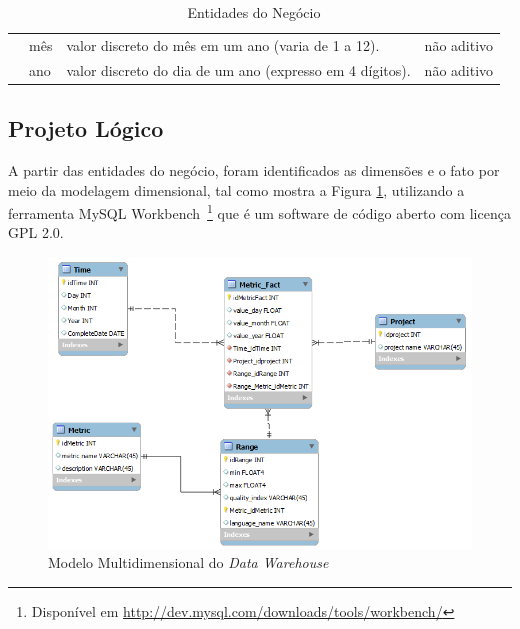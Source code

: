 \begin{table}[h]
\begin{tabular}{|p{2cm}|p{2.5cm}|p{4cm}|p{2cm}|}
                           
                           & mês                   & valor discreto do mês em um ano (varia de 1 a 12).  & não aditivo                 \\ \cline{2-4} 

                           & ano                   & valor discreto do dia de um ano (expresso em 4 dígitos).  & não aditivo                 \\ \cline{2-4} 

                \hline         
\end{tabular}
\caption{Entidades do Negócio}
\label{entidades}
\end{table}
\FloatBarrier





\subsection{Projeto Lógico}

A partir das entidades do negócio, foram identificados as dimensões e o fato por meio da modelagem dimensional, tal como mostra a Figura \ref{esquema}, utilizando a ferramenta MySQL Workbench~\footnote{Disponível em \url{http://dev.mysql.com/downloads/tools/workbench/}} que é um software de código aberto com licença GPL 2.0.


\begin{figure}[ht!]
\begin{center}
\includegraphics[bb=0 0 738 380, scale=0.8]{figuras/modelo.png}
\caption{Modelo Multidimensional do \textit{Data Warehouse}}
\label{esquema}
\end{center}
\end{figure}
\FloatBarrier

